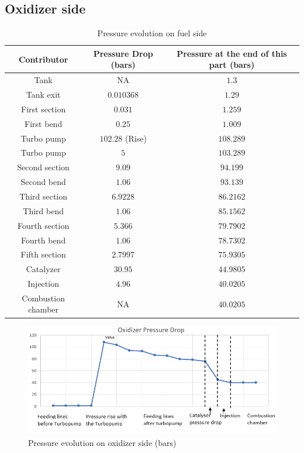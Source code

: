 \subsection{Oxidizer side}
\begin{table}[H]
	\centering
\begin{tabular}[H]{|c|c|c|}
	\hline
	\cellcolor{gray!50}Contributor& \cellcolor{gray!50}Pressure Drop (bars) & \cellcolor{gray!50}Pressure at the end of this part (bars)\\
	\hline
	Tank & NA & $1.3$ \\
	\hline
	Tank exit & $0.010368$ & $1.29$\\
	\hline
	First section & $0.031$ &$1.259$\\
	\hline
	First bend &$0.25$ &$1.009$\\
	\hline
	Turbo pump & $102.28 $ (Rise) &$108.289$\\
	\hline
	Turbo pump & $5$ &$103.289$\\
	\hline
	Second section &$9.09$ &$94.199$\\
	\hline
	Second bend &$1.06$ &$93.139$\\
	\hline
	Third section &$6.9228$ &$86.2162$\\
	\hline
	Third bend &$1.06$ &$85.1562$\\
	\hline
	Fourth section &$5.366$ &$79.7902$\\
	\hline
	Fourth bend &$1.06$ &$78.7302$\\
	\hline
	Fifth section &$2.7997$ &$75.9305$\\
	\hline
	Catalyzer &$30.95$ &$44.9805$\\
	\hline
	Injection &$4.96$ &$40.0205$\\
	\hline
	Combustion chamber & NA &$40.0205$\\
	\hline
\end{tabular}
\caption{Pressure evolution on fuel side}
\end{table}
\begin{figure}[H]
	\centering
	\includegraphics[width=\linewidth]{oxchart}
	\caption{Pressure evolution on oxidizer side (bars)}
\end{figure}
